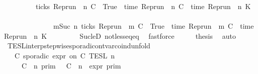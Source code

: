 \begin{isabellebody}
\ \ \ \ \ \ {\isacharequal}\ {\isacharbraceleft}\ {\isasymrho}{\isachardot}\ ticks\ {\isacharparenleft}{\isacharparenleft}Rep{\isacharunderscore}run\ {\isasymrho}{\isacharparenright}\ n\ C\ {\isacharequal}\ True\ {\isasymand}\ time\ {\isacharparenleft}{\isacharparenleft}Rep{\isacharunderscore}run\ {\isasymrho}{\isacharparenright}\ n\ C\ {\isacharequal}\ time\ {\isacharparenleft}{\isacharparenleft}Rep{\isacharunderscore}run\ {\isasymrho}{\isacharparenright}\ n{\isacharprime}\ K{\isacharparenright}\ {\isacharplus}\ {\isasymtau}\isanewline
\ \ \ \ \ \ \ \ \ \ \ \ \ {\isasymor}\ {\isacharparenleft}{\isasymexists}m{\isasymge}Suc\ n{\isachardot}\ ticks\ {\isacharparenleft}{\isacharparenleft}Rep{\isacharunderscore}run\ {\isasymrho}{\isacharparenright}\ m\ C\ {\isacharequal}\ True\ {\isasymand}\ time\ {\isacharparenleft}{\isacharparenleft}Rep{\isacharunderscore}run\ {\isasymrho}{\isacharparenright}\ m\ C\ {\isacharequal}\ time\ {\isacharparenleft}{\isacharparenleft}Rep{\isacharunderscore}run\ {\isasymrho}{\isacharparenright}\ n{\isacharprime}\ K{\isacharparenright}\ {\isacharplus}\ {\isasymtau}{\isacharparenright}\ {\isacharbraceright}{\isacartoucheclose}\isanewline
\ \ \ \ \isamarkupfalse%
\ Suc{\isacharunderscore}leD\ not{\isacharunderscore}less{\isacharunderscore}eq{\isacharunderscore}eq\ \isamarkupfalse%
\ fastforce\isanewline
\ \ \isamarkupfalse%
\ \isamarkupfalse%
\ {\isacharquery}thesis\ \isamarkupfalse%
\ auto\isanewline
{}\isamarkupfalse%
%
\endisatagproof
{\isafoldproof}%
%
\isadelimproof
\isanewline
%
\endisadelimproof
\isanewline
{}\isamarkupfalse%
\ TESL{\isacharunderscore}interp{\isacharunderscore}stepwise{\isacharunderscore}sporadicon{\isacharunderscore}tvar{\isacharunderscore}coind{\isacharunderscore}unfold{}{\isacharcolon}\isanewline
\ \ {\isacartoucheopen}{\isasymlbrakk}\ C\ sporadic{\isasymsharp}\ {\isasymtau}\isactrlsub e\isactrlsub x\isactrlsub p\isactrlsub r\ on\ C\ {\isasymrbrakk}\isactrlsub T\isactrlsub E\isactrlsub S\isactrlsub L\isactrlbsup {\isasymge}\ n\isactrlesup \ {\isacharequal}\isanewline
\ \ \ \ {\isasymlbrakk}\ C\ {\isasymUp}\ n\ {\isasymrbrakk}\isactrlsub p\isactrlsub r\isactrlsub i\isactrlsub m\ {\isasyminter}\ {\isasymlbrakk}\ C\ {\isasymDown}\ n\ {\isacharat}{\isasymsharp}\ {\isasymtau}\isactrlsub e\isactrlsub x\isactrlsub p\isactrlsub r\ {\isasymrbrakk}\isactrlsub p\isactrlsub r\isactrlsub i\isactrlsub m\ \ \ \ \ \ \ \ %

\end{isabellebody}
